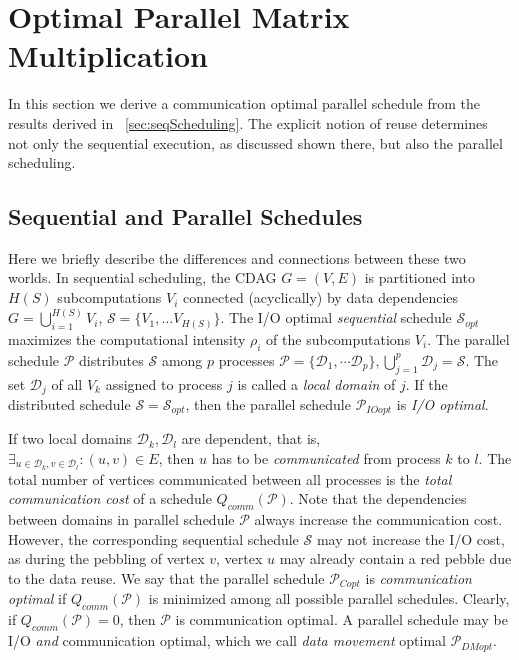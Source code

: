 \documentclass[sigplan,review,anonymous]{acmart}\settopmatter{printfolios=true,printccs=false,printacmref=false}
\begin{document}
\section{Optimal Parallel Matrix Multiplication}
\label{sec:parOptimality}

In this section we derive a communication optimal parallel schedule 
from the
results derived in ~\cref{sec:seqScheduling}. The explicit notion of reuse 
determines not only the sequential execution, as
discussed shown there, but also the parallel scheduling.

\subsection{Sequential and Parallel Schedules}
\label{sec:seqpar}

Here we briefly describe the differences and connections between these two 
worlds. In sequential scheduling, the CDAG $G = (V,E)$ is partitioned into 
$H(S)$ 
subcomputations $V_i$ connected (acyclically) by data dependencies $G = 
\bigcup_{i=1}^{H(S)} V_i$, $\mathcal{S} = \{V_1, \dots V_{H(S)}\}$. The I/O 
optimal \emph{sequential} schedule $\mathcal{S}_{opt}$ maximizes the 
computational intensity 
$\rho_i$ of 
the subcomputations $V_i$. The parallel schedule $\mathcal{P}$ distributes 
$\mathcal{S}$ among $p$ processes $\mathcal{P} = \{\mathcal{D}_1, \cdots 
\mathcal{D}_p\}, \bigcup_{j=1}^p \mathcal{D}_j = \mathcal{S}$. The set 
$\mathcal{D}_j$ of all 
$V_k$ assigned to 
process $j$ is called a \emph{local domain} of $j$. If 
the distributed schedule $\mathcal{S} = 
\mathcal{S}_{opt}$, then the parallel schedule $\mathcal{P}_{IOopt}$ is 
\emph{I/O optimal}.

If two local domains $\mathcal{D}_k, \mathcal{D}_l$ are dependent, that is,\\
$\exists_{u \in \mathcal{D}_k, v \in \mathcal{D}_l} : (u,v) \in E$, then $u$ 
has to be \emph{communicated} from process $k$ to $l$. The total number of 
vertices communicated between all processes is the \emph{total communication 
cost} of a schedule $Q_{comm}(\mathcal{P})$. 
Note that the dependencies between domains in parallel schedule $\mathcal{P}$ 
always increase the communication cost. However, the corresponding sequential 
schedule $\mathcal{S}$ may not increase the I/O cost, as 
during the pebbling of vertex $v$, vertex $u$ may already contain a red pebble 
due to the data reuse.
We say that the parallel schedule 
$\mathcal{P}_{Copt}$ is \emph{communication optimal} if $Q_{comm}(\mathcal{P})$ 
is minimized among all possible parallel schedules. Clearly, if 
$Q_{comm}(\mathcal{P}) = 0$, then $\mathcal{P}$ is communication optimal. A 
parallel schedule may be I/O \emph{and} communication optimal, which we call 
\emph{data movement} optimal 
$\mathcal{P}_{DMopt}$.
\end{document}
